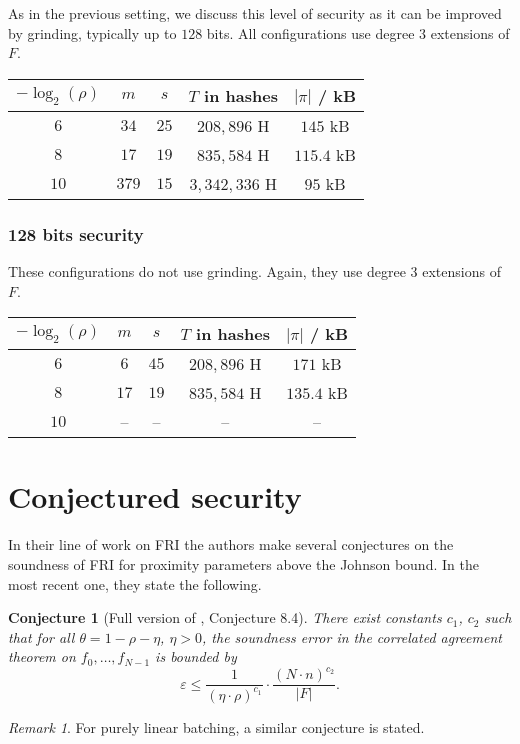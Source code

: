 \documentclass[11pt,article,oneside]{memoir}
\newtheorem{conj}[]{Conjecture}
\theoremstyle{definition}
\theoremstyle{remark}
\newtheorem{rem}[thm]{Remark}
\begin{document}
As in the previous setting, we discuss this level of security as it can be improved by grinding, typically up to $128$ bits. 
All configurations use degree $3$ extensions of $F$.
\begin{center}
\begin{tabular}{|c|c|c|c|c|}
\hline
$-\log_2(\rho)$ & $m$	& $s$	& $T$ in hashes 	& $|\pi|$ / kB
\\\hline\hline
$6$ 	& $34$	& $25$	& $208,896$ H 	& $145$ kB
\\
$8$ & $17$	& $19$	& $835,584$ H & $115.4$ kB
\\
$10$ & $379$	& $15$	& $3,342,336$ H 	& $95$ kB
\\\hline
\end{tabular}
\end{center}

\subsubsection{128 bits security}
These configurations do not use grinding. 
Again, they use degree $3$ extensions of $F$.

\begin{center}
\begin{tabular}{|c|c|c|c|c|}
\hline
$-\log_2(\rho)$ & $m$	& $s$	& $T$ in hashes 	& $|\pi|$ / kB
\\\hline\hline
$6$ 	& $6$	& $45$	& $208,896$ H 	& $171$ kB
\\
$8$ & $17$	& $19$	& $835,584$ H & $135.4$ kB
\\
$10$ & --	& --	& --  	&  --
\\\hline
\end{tabular}
\end{center}


\section{Conjectured security}
\label{s:FRIConjecture}

In their line of work on FRI \cite{FRI, DEEPFRI, ProximityGaps} the authors make several conjectures on the soundness of FRI for proximity parameters above the Johnson bound. 
In the most recent one, they state the following.

\begin{conj}[Full version of \cite{ProximityGaps}, Conjecture 8.4]
\label{con:FRIsoundness}
There exist constants $c_1$, $c_2$ such that for all $\theta =1-\rho -\eta$, $\eta >0$,  the soundness error in the correlated agreement theorem on $f_0,\ldots ,f_{N-1}$ is bounded by
\[
\varepsilon \leq \frac{1}{(\eta\cdot\rho)^{c_1}} \cdot \frac{(N\cdot n)^{c_2}}{|F|}.
\]
\end{conj}
\begin{rem}
For purely linear batching, a similar conjecture is stated.
\end{rem}
\end{document}
